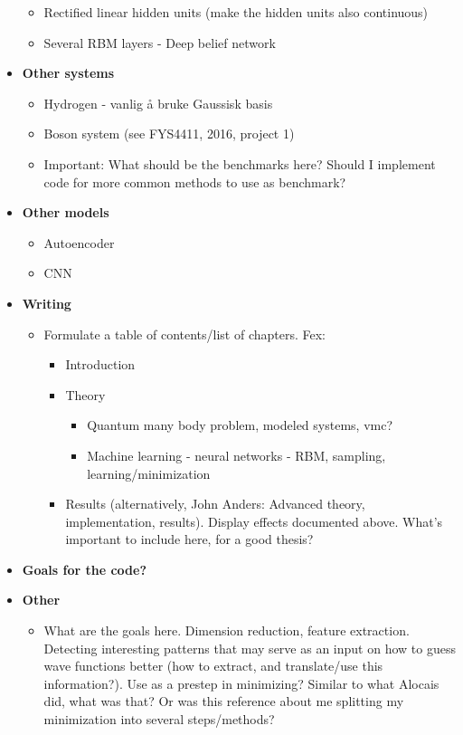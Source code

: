 \documentclass[norsk,a4paper,11pt]{article}
\begin{document}
\begin{itemize}
\begin{itemize}
		\item Rectified linear hidden units (make the hidden units also continuous)
		\item Several RBM layers - Deep belief network
	\end{itemize}
	\item \textbf{Other systems}
	\begin{itemize}
		\item Hydrogen - vanlig å bruke Gaussisk basis
		\item Boson system (see FYS4411, 2016, project 1)
		\item Important: What should be the benchmarks here? Should I implement code for more common methods to use as benchmark?
	\end{itemize}
	\item \textbf{Other models}
	\begin{itemize}
		\item Autoencoder
		\item CNN
	\end{itemize}
	\item \textbf{Writing}
	\begin{itemize}
		\item Formulate a table of contents/list of chapters. Fex:
		\begin{itemize}
			\item Introduction
			\item Theory
			\begin{itemize}
				\item Quantum many body problem, modeled systems, vmc?
				\item Machine learning - neural networks - RBM, sampling, learning/minimization
			\end{itemize}
				\item Results (alternatively, John Anders: Advanced theory, implementation, results). Display effects documented above. What's important to include here, for a good thesis?
		\end{itemize}
	\end{itemize}
	\item \textbf{Goals for the code?}
	\item \textbf{Other}
	\begin{itemize}
		\item What are the goals here. Dimension reduction, feature extraction. Detecting interesting patterns that may serve as an input on how to guess wave functions better (how to extract, and translate/use this information?). Use as a prestep in minimizing? Similar to what Alocais did, what was that? Or was this reference about me splitting my minimization into several steps/methods?
	\end{itemize}
\end{itemize}

%

\end{document}
